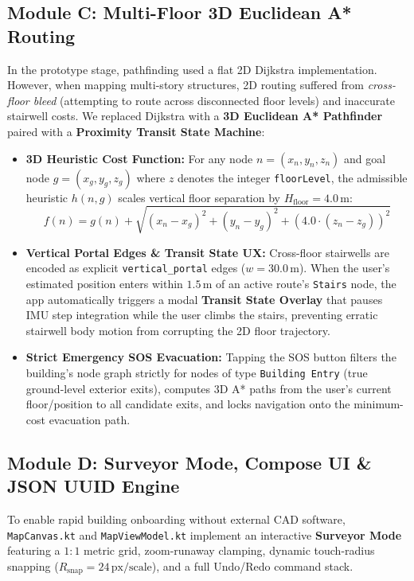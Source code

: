 \documentclass[11pt,a4paper]{article}
\begin{document}
\subsection{Module C: Multi-Floor 3D Euclidean A* Routing}
In the prototype stage, pathfinding used a flat 2D Dijkstra implementation. However, when mapping multi-story structures, 2D routing suffered from \textit{cross-floor bleed} (attempting to route across disconnected floor levels) and inaccurate stairwell costs. We replaced Dijkstra with a \textbf{3D Euclidean A* Pathfinder} paired with a \textbf{Proximity Transit State Machine}:
\begin{itemize}
    \item \textbf{3D Heuristic Cost Function:} For any node $n = (x_n, y_n, z_n)$ and goal node $g = (x_g, y_g, z_g)$ where $z$ denotes the integer \texttt{floorLevel}, the admissible heuristic $h(n, g)$ scales vertical floor separation by $H_{\text{floor}} = 4.0\,\text{m}$:
    \begin{equation}
        f(n) = g(n) + \sqrt{(x_n - x_g)^2 + (y_n - y_g)^2 + \left(4.0 \cdot (z_n - z_g)\right)^2}
    \end{equation}
    \item \textbf{Vertical Portal Edges \& Transit State UX:} Cross-floor stairwells are encoded as explicit \texttt{vertical\_portal} edges ($w = 30.0\,\text{m}$). When the user's estimated position enters within $1.5\,\text{m}$ of an active route's \texttt{Stairs} node, the app automatically triggers a modal \textbf{Transit State Overlay} that pauses IMU step integration while the user climbs the stairs, preventing erratic stairwell body motion from corrupting the 2D floor trajectory.
    \item \textbf{Strict Emergency SOS Evacuation:} Tapping the SOS button filters the building's node graph strictly for nodes of type \texttt{Building Entry} (true ground-level exterior exits), computes 3D A* paths from the user's current floor/position to all candidate exits, and locks navigation onto the minimum-cost evacuation path.
\end{itemize}

\subsection{Module D: Surveyor Mode, Compose UI \& JSON UUID Engine}
To enable rapid building onboarding without external CAD software, \texttt{MapCanvas.kt} and \texttt{MapViewModel.kt} implement an interactive \textbf{Surveyor Mode} featuring a $1:1$ metric grid, zoom-runaway clamping, dynamic touch-radius snapping ($R_{\text{snap}} = 24\,\text{px} / \text{scale}$), and a full Undo/Redo command stack.
\end{document}
